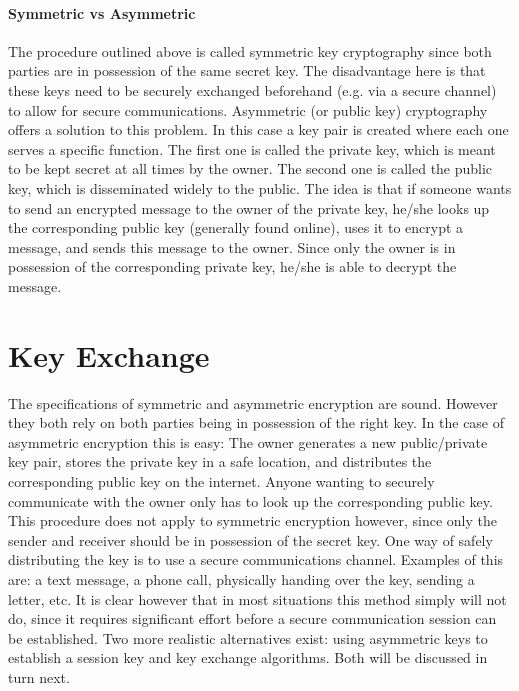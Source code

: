 \paragraph{Symmetric vs Asymmetric}The procedure outlined above is called symmetric key cryptography since both parties are in possession of the same secret key. The disadvantage here is that these keys need to be securely exchanged beforehand (e.g. via a secure channel) to allow for secure communications. Asymmetric (or public key) cryptography offers a solution to this problem. In this case a key pair is created where each one serves a specific function. The first one is called the private key, which is meant to be kept secret at all times by the owner. The second one is called the public key, which is disseminated widely to the public. The idea is that if someone wants to send an encrypted message to the owner of the private key, he/she looks up the corresponding public key (generally found online), uses it to encrypt a message, and sends this message to the owner. Since only the owner is in possession of the corresponding private key, he/she is able to decrypt the message.

\section{Key Exchange} 
\label{sec:key_exchange}

The specifications of symmetric and asymmetric encryption are sound. However they both rely on both parties being in possession of the right key. In the case of asymmetric encryption this is easy: The owner generates a new public/private key pair, stores the private key in a safe location, and distributes the corresponding public key on the internet. Anyone wanting to securely communicate with the owner only has to look up the corresponding public key. This procedure does not apply to symmetric encryption however, since only the sender and receiver should be in possession of the secret key. One way of safely distributing the key is to use a secure communications channel. Examples of this are: a text message, a phone call, physically handing over the key, sending a letter, etc. It is clear however that in most situations this method simply will not do, since it requires significant effort before a secure communication session can be established. Two more realistic alternatives exist: using asymmetric keys to establish a session key and key exchange algorithms. Both will be discussed in turn next.

